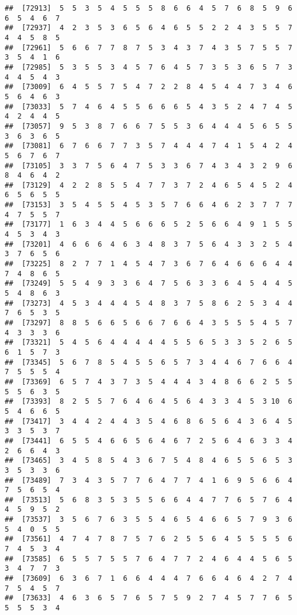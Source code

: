 \documentclass[
]{book}
\begin{document}
\begin{verbatim}
##  [72913]  5  5  3  5  4  5  5  5  8  6  6  4  5  7  6  8  5  9  6  6  5  4  6  7
##  [72937]  4  2  3  5  3  6  5  6  4  6  5  5  2  2  4  3  5  5  7  4  4  5  8  5
##  [72961]  5  6  6  7  7  8  7  5  3  4  3  7  4  3  5  7  5  5  7  3  5  4  1  6
##  [72985]  5  3  5  5  3  4  5  7  6  4  5  7  3  5  3  6  5  7  3  4  4  5  4  3
##  [73009]  6  4  5  5  7  5  4  7  2  2  8  4  5  4  4  7  3  4  6  5  6  4  6  3
##  [73033]  5  7  4  6  4  5  5  6  6  6  5  4  3  5  2  4  7  4  5  4  2  4  4  5
##  [73057]  9  5  3  8  7  6  6  7  5  5  3  6  4  4  4  5  6  5  5  3  6  3  6  5
##  [73081]  6  7  6  6  7  7  3  5  7  4  4  4  7  4  1  5  4  2  4  5  6  7  6  7
##  [73105]  3  3  7  5  6  4  7  5  3  3  6  7  4  3  4  3  2  9  6  8  4  6  4  2
##  [73129]  4  2  2  8  5  5  4  7  7  3  7  2  4  6  5  4  5  2  4  6  5  6  5  5
##  [73153]  3  5  4  5  5  4  5  3  5  7  6  6  4  6  2  3  7  7  7  4  7  5  5  7
##  [73177]  1  6  3  4  4  5  6  6  6  5  2  5  6  6  4  9  1  5  5  4  5  3  4  3
##  [73201]  4  6  6  6  4  6  3  4  8  3  7  5  6  4  3  3  2  5  4  3  7  6  5  6
##  [73225]  8  2  7  7  1  4  5  4  7  3  6  7  6  4  6  6  6  4  4  7  4  8  6  5
##  [73249]  5  5  4  9  3  3  6  4  7  5  6  3  3  6  4  5  4  4  5  5  4  8  6  3
##  [73273]  4  5  3  4  4  4  5  4  8  3  7  5  8  6  2  5  3  4  4  7  6  5  3  5
##  [73297]  8  8  5  6  6  5  6  6  7  6  6  4  3  5  5  5  4  5  7  4  3  3  3  6
##  [73321]  5  4  5  6  4  4  4  4  4  5  5  6  5  3  3  5  2  6  5  6  1  5  7  3
##  [73345]  5  6  7  8  5  4  5  5  6  5  7  3  4  4  6  7  6  6  4  7  5  5  5  4
##  [73369]  6  5  7  4  3  7  3  5  4  4  4  3  4  8  6  6  2  5  5  5  5  6  3  5
##  [73393]  8  2  5  5  7  6  4  6  4  5  6  4  3  3  4  5  3 10  6  5  4  6  6  5
##  [73417]  3  4  4  2  4  4  3  5  4  6  8  6  5  6  4  3  6  4  5  3  3  5  3  7
##  [73441]  6  5  5  4  6  6  5  6  4  6  7  2  5  6  4  6  3  3  4  2  6  6  4  3
##  [73465]  3  4  5  8  5  4  3  6  7  5  4  8  4  6  5  5  6  5  3  3  5  3  3  6
##  [73489]  7  3  4  3  5  7  7  6  4  7  7  4  1  6  9  5  6  6  4  7  5  6  5  4
##  [73513]  5  6  8  3  5  3  5  5  6  6  4  4  7  7  6  5  7  6  4  4  5  9  5  2
##  [73537]  3  5  6  7  6  3  5  5  4  6  5  4  6  6  5  7  9  3  6  5  4  0  5  5
##  [73561]  4  7  4  7  8  7  5  7  6  2  5  5  6  4  5  5  5  5  6  7  4  5  3  4
##  [73585]  6  5  5  7  5  5  7  6  4  7  7  2  4  6  4  4  5  6  5  3  4  7  7  3
##  [73609]  6  3  6  7  1  6  6  4  4  4  7  6  6  4  6  4  2  7  4  7  5  4  5  7
##  [73633]  4  6  3  6  5  7  6  5  7  5  9  2  7  4  5  7  7  6  5  5  5  5  3  4

\end{verbatim}
\end{document}
